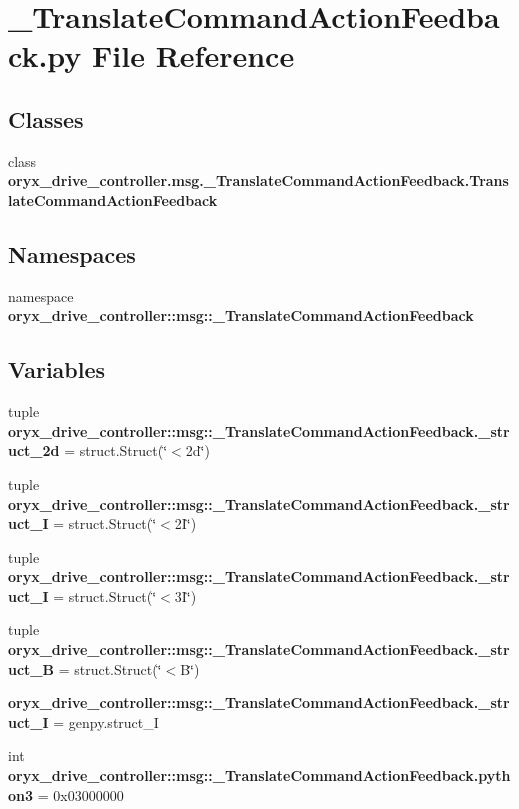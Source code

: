 \section{\-\_\-\-Translate\-Command\-Action\-Feedback.\-py \-File \-Reference}
\label{__TranslateCommandActionFeedback_8py}
\subsection*{\-Classes}
\begin{DoxyCompactItemize}
\item 
class {\bf oryx\-\_\-drive\-\_\-controller.\-msg.\-\_\-\-Translate\-Command\-Action\-Feedback.\-Translate\-Command\-Action\-Feedback}
\end{DoxyCompactItemize}
\subsection*{\-Namespaces}
\begin{DoxyCompactItemize}
\item 
namespace {\bf oryx\-\_\-drive\-\_\-controller\-::msg\-::\-\_\-\-Translate\-Command\-Action\-Feedback}
\end{DoxyCompactItemize}
\subsection*{\-Variables}
\begin{DoxyCompactItemize}
\item 
tuple {\bf oryx\-\_\-drive\-\_\-controller\-::msg\-::\-\_\-\-Translate\-Command\-Action\-Feedback.\-\_\-struct\-\_\-2d} = struct.\-Struct(\char`\"{}$<$2d\char`\"{})
\item 
tuple {\bf oryx\-\_\-drive\-\_\-controller\-::msg\-::\-\_\-\-Translate\-Command\-Action\-Feedback.\-\_\-struct\-\_\-I} = struct.\-Struct(\char`\"{}$<$2\-I\char`\"{})
\item 
tuple {\bf oryx\-\_\-drive\-\_\-controller\-::msg\-::\-\_\-\-Translate\-Command\-Action\-Feedback.\-\_\-struct\-\_\-I} = struct.\-Struct(\char`\"{}$<$3\-I\char`\"{})
\item 
tuple {\bf oryx\-\_\-drive\-\_\-controller\-::msg\-::\-\_\-\-Translate\-Command\-Action\-Feedback.\-\_\-struct\-\_\-\-B} = struct.\-Struct(\char`\"{}$<$\-B\char`\"{})
\item 
{\bf oryx\-\_\-drive\-\_\-controller\-::msg\-::\-\_\-\-Translate\-Command\-Action\-Feedback.\-\_\-struct\-\_\-\-I} = genpy.\-struct\-\_\-\-I
\item 
int {\bf oryx\-\_\-drive\-\_\-controller\-::msg\-::\-\_\-\-Translate\-Command\-Action\-Feedback.\-python3} = 0x03000000
\end{DoxyCompactItemize}

